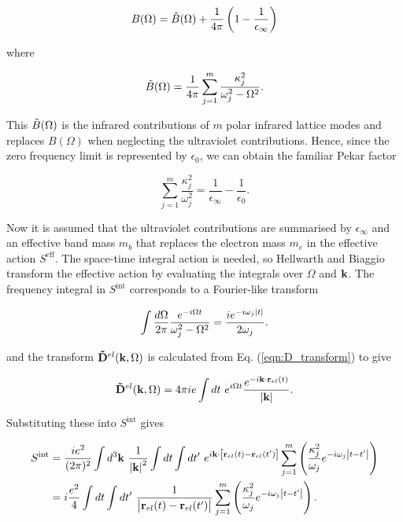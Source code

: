 \begin{equation}
    B(\Omega) = \Tilde{B}(\Omega) + \frac{1}{4\pi} \left( 1 - \frac{1}{\epsilon_\infty} \right)
\end{equation}

where

\begin{equation}
\Tilde{B}(\Omega) = \frac{1}{4\pi} \sum_{j=1}^m \frac{\kappa_j^2}{\omega_j^2 - \Omega^2}.  
\end{equation}

This $\Tilde{B}(\Omega)$ is the infrared contributions of $m$ polar infrared lattice modes and replaces $B(\Omega)$ when neglecting the ultraviolet contributions. Hence, since the zero frequency limit is represented by $\epsilon_0$, we can obtain the familiar Pekar factor

\begin{equation}
    \sum_{j=1}^m \frac{\kappa_j^2}{\omega_j^2} = \frac{1}{\epsilon_\infty} - \frac{1}{\epsilon_0}.
\end{equation}

Now it is assumed that the ultraviolet contributions are summarised by $\epsilon_\infty$ and an effective band mass $m_b$ that replaces the electron mass $m_e$ in the effective action $S^{\text{eff}}$. The space-time integral action is needed, so  Hellwarth and Biaggio transform the effective action by evaluating the integrals over $\Omega$ and $\vb{k}$. The frequency integral in $S^{\text{int}}$ corresponds to a Fourier-like transform

\begin{equation}
    \int \frac{d\Omega}{2\pi} \frac{e^{-i\Omega t}}{\omega_j^2 - \Omega^2} = \frac{i e^{-i\omega_j \abs{t}}}{2\omega_j}.
\end{equation}

and the transform $\vb{\Tilde{D}}^{el}(\vb{k}, \Omega)$ is calculated from Eq. (\ref{eqn:D_transform}) to give

\begin{equation}
    \vb{\Tilde{D}}^{el}(\vb{k}, \Omega) = 4\pi i e \int dt\ e^{i\Omega t} \frac{e^{-i\vb{k} \cdot \vb{r}_{el}(t)}}{\abs{\vb{k}}}.
\end{equation}

Substituting these into $S^{\text{int}}$ gives

\begin{equation}
    \begin{aligned}
        S^{\text{int}} &= \frac{i e^2}{(2\pi)^2} \int d^3 \vb{k}\ \frac{1}{\abs{\vb{k}}^2} \int dt \int dt'\ e^{i\vb{k} \cdot \left[ \vb{r}_{el}(t) - \vb{r}_{el}(t') \right]} \sum_{j = 1}^m \left( \frac{\kappa_j^2}{\omega_j} e^{-i\omega_j\abs{t-t'}} \right) \\
        &= i \frac{e^2}{4} \int dt \int dt'\ \frac{1}{\abs{\vb{r}_{el}(t) - \vb{r}_{el}(t')}} \sum_{j=1}^m \left( \frac{\kappa_j^2}{\omega_j} e^{-i\omega_j\abs{t-t'}} \right).
    \end{aligned}
\end{equation}

